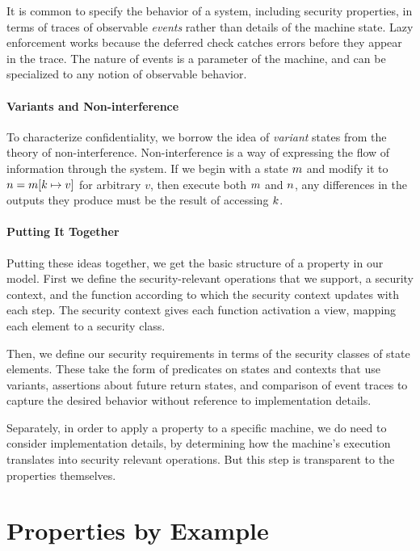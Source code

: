 \documentclass[10pt,conference]{ieeetran}%
\theoremstyle{definition}
\begin{document}
It is common to specify the behavior of a system, including security properties, in
terms of traces of observable {\em events} rather than details of the machine state.
Lazy enforcement works because the deferred check catches errors before they appear
in the trace. The nature of events is a parameter of the machine, and can be specialized
to any notion of observable behavior.

\paragraph*{Variants and Non-interference}

To characterize confidentiality, we borrow the idea of \emph{variant} states
from the theory of non-interference. Non-interference is a way of expressing
the flow of information through the system. If we begin with a state \(m\)
and modify it to \(n = m[k \mapsto v]\) for arbitrary \(v\),
then execute both \(m\) and \(n\), any differences in the outputs they
produce must be the result of accessing \(k\).

\paragraph*{Putting It Together}

Putting these ideas together, we get the basic structure of a property in our model.
First we define the security-relevant operations that we support, a security context,
and the function according to which the security context updates with each step.
The security context gives each function activation a view, mapping each element to a
security class.

Then, we define our security requirements in terms of the security classes of state
elements. These take the form of predicates on states and contexts that use variants,
assertions about future return states, and comparison of event traces to capture the
desired behavior without reference to implementation details.

Separately, in order to apply a property to a specific machine, we do need to consider
implementation details, by determining how the machine's execution translates into
security relevant operations. But this step is transparent to the properties themselves.

\section{Properties by Example}
\label{sec:example}
\end{document}
